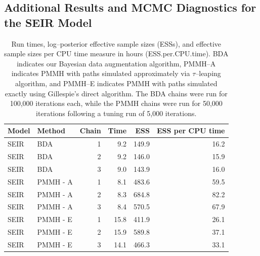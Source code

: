 \subsection{Additional Results and MCMC Diagnostics for the SEIR Model}

\begin{table}[htbp]
	\centering
	\begin{tabular}{llrrrr}
		\hline
		Model & Method & Chain & Time & ESS & ESS per CPU time \\ 
		\hline
		SEIR & BDA &  1 & 9.2 & 149.9 & 16.2 \\ 
		SEIR & BDA &  2 & 9.2 & 146.0 & 15.9 \\ 
		SEIR & BDA &  3 & 9.0 & 143.9 & 16.0 \\ 
		SEIR & PMMH - A &  1 & 8.1 & 483.6 & 59.5 \\ 
		SEIR & PMMH - A &  2 & 8.3 & 684.8 & 82.2 \\ 
		SEIR & PMMH - A &  3 & 8.4 & 570.5 & 67.9 \\ 
		SEIR & PMMH - E &  1 & 15.8 & 411.9 & 26.1 \\ 
		SEIR & PMMH - E &  2 & 15.9 & 589.8 & 37.1 \\ 
		SEIR & PMMH - E &  3 & 14.1 & 466.3 & 33.1 \\ 
		\hline
	\end{tabular}
	\caption[Simulation 1 SEIR model log--posterior effective sample sizes and run times.]{Run times, log--posterior effective sample sizes (ESSs), and effective sample sizes per CPU time measure in hours (ESS.per.CPU.time). BDA indicates our Bayesian data augmentation algorithm, PMMH--A indicates PMMH with paths simulated approximately via $ \tau $--leaping algorithm, and PMMH--E indicates PMMH with paths simulated exactly using Gillespie's direct algorithm. The BDA chains were run for 100,000 iterations each, while the PMMH chains were run for 50,000 iterations following a tuning run of 5,000 iterations.}
	\label{tab:sim1_seir_ess}
\end{table}

